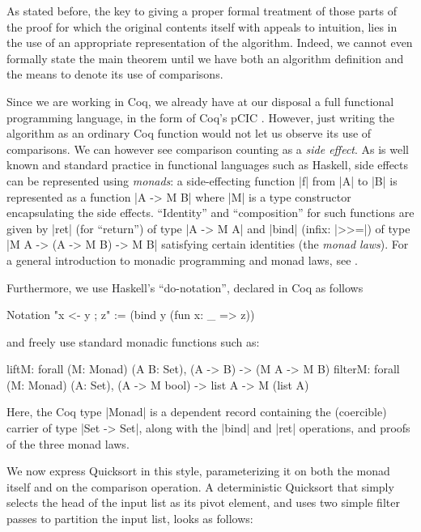 \documentclass[runningheads]{llncs}
\begin{document}
As stated before, the key to giving a proper formal treatment of those parts of the proof for which the original contents itself with appeals to intuition, lies in the use of an appropriate representation of the algorithm. Indeed, we cannot even formally state the main theorem until we have both an algorithm definition and the means to denote its use of comparisons.

Since we are working in Coq, we already have at our disposal a full functional
programming language, in the form of Coq's pCIC \cite{coq'art}. However, just
writing the algorithm as an ordinary Coq function would not let us observe its
use of comparisons. 
We can however see comparison counting as a \emph{side effect}. As is well
known and standard practice in functional languages such as Haskell, side
effects can be represented using \emph{monads}: a side-effecting function |f|
from |A| to |B| is represented as a function |A -> M B| where |M| is a type
constructor encapsulating the side effects. ``Identity'' and ``composition''
for such functions are given by |ret| (for ``return'') of type |A -> M A| and
|bind| (infix: |>>=|) of type |M A -> (A -> M B) -> M B| satisfying certain
identities (the \emph{monad laws}). For a general introduction to monadic
programming and monad laws, see \cite{wadler93monads}. 

\noindent Furthermore, we use
Haskell's ``do-notation'', declared in Coq as follows 
\begin{code}
 Notation "x <- y ; z" := (bind y (fun x: _ => z)) 
\end{code}
and freely use standard monadic functions such as:
\begin{code}
 liftM: forall (M: Monad) (A B: Set), (A -> B) -> (M A -> M B)
 filterM: forall (M: Monad) (A: Set), (A -> M bool) -> list A -> M (list A)
\end{code}
Here, the Coq type |Monad| is a dependent record containing the (coercible) carrier of type |Set
-> Set|, along with the |bind| and |ret| operations, and proofs of the three monad laws. 

We now express Quicksort in this style, parameterizing it on both the monad
itself and on the comparison operation. A deterministic Quicksort that simply selects the head of the input list as its pivot element, and uses two simple filter passes to partition the input list, looks as follows:
\end{document}
